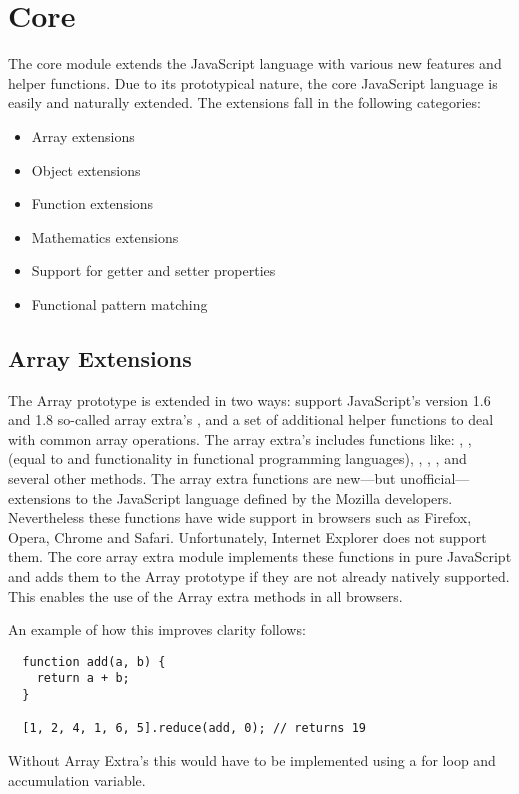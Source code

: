 \section{Core}
The core module extends the JavaScript language with various new features and helper functions. Due to its prototypical nature, the core JavaScript language is easily and naturally extended. The extensions fall in the following categories:

\begin{itemize}
\item Array extensions
\item Object extensions
\item Function extensions
\item Mathematics extensions
\item Support for getter and setter properties
\item Functional pattern matching
\end{itemize}

\subsection{Array Extensions}
The Array prototype is extended in two ways: support JavaScript's version 1.6 and 1.8 so-called array extra's \cite{mozilla07, mozilla08}, and a set of additional helper functions to deal with common array operations. The array extra's includes functions like: , ,  (equal to  and  functionality in functional programming languages), , , , and several other methods. The array extra functions are new---but unofficial---extensions to the JavaScript language defined by the Mozilla developers. Nevertheless these functions have wide support in browsers such as Firefox, Opera, Chrome and Safari. Unfortunately, Internet Explorer does not support them. The core array extra module implements these functions in pure JavaScript and adds them to the Array prototype if they are not already natively supported. This enables the use of the Array extra methods in all browsers.

An example of how this improves clarity follows:
\begin{verbatim}
  function add(a, b) {
    return a + b;
  }

  [1, 2, 4, 1, 6, 5].reduce(add, 0); // returns 19
\end{verbatim}
Without Array Extra's this would have to be implemented using a for loop and accumulation variable.


